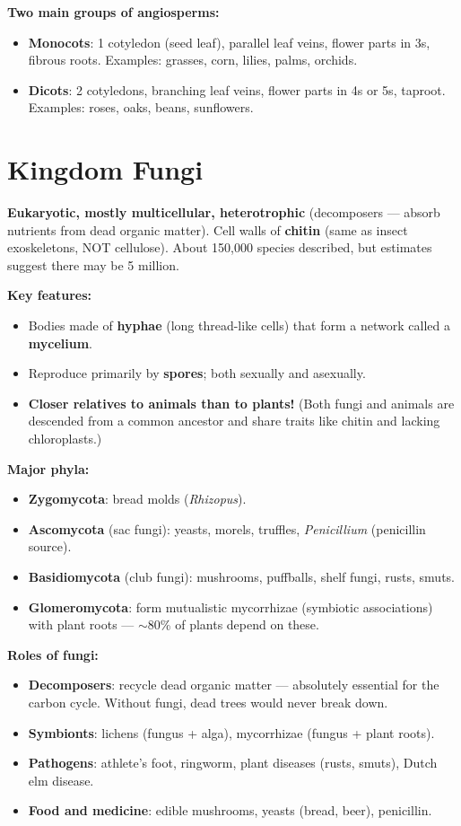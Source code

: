 \documentclass[11pt, letterpaper]{article}
\begin{document}
\textbf{Two main groups of angiosperms:}
\begin{itemize}[noitemsep]
  \item \textbf{Monocots}: 1 cotyledon (seed leaf), parallel leaf veins, flower parts in 3s, fibrous roots. Examples: grasses, corn, lilies, palms, orchids.
  \item \textbf{Dicots}: 2 cotyledons, branching leaf veins, flower parts in 4s or 5s, taproot. Examples: roses, oaks, beans, sunflowers.
\end{itemize}

\section*{Kingdom Fungi}

\textbf{Eukaryotic, mostly multicellular, heterotrophic} (decomposers --- absorb nutrients
from dead organic matter). Cell walls of \textbf{chitin} (same as insect exoskeletons, NOT
cellulose). About 150{,}000 species described, but estimates suggest there may be 5 million.

\textbf{Key features:}
\begin{itemize}[noitemsep]
  \item Bodies made of \textbf{hyphae} (long thread-like cells) that form a network called a \textbf{mycelium}.
  \item Reproduce primarily by \textbf{spores}; both sexually and asexually.
  \item \textbf{Closer relatives to animals than to plants!} (Both fungi and animals are descended from a common ancestor and share traits like chitin and lacking chloroplasts.)
\end{itemize}

\textbf{Major phyla:}
\begin{itemize}[noitemsep]
  \item \textbf{Zygomycota}: bread molds (\textit{Rhizopus}).
  \item \textbf{Ascomycota} (sac fungi): yeasts, morels, truffles, \textit{Penicillium} (penicillin source).
  \item \textbf{Basidiomycota} (club fungi): mushrooms, puffballs, shelf fungi, rusts, smuts.
  \item \textbf{Glomeromycota}: form mutualistic mycorrhizae (symbiotic associations) with plant roots --- $\sim$80\% of plants depend on these.
\end{itemize}

\textbf{Roles of fungi:}
\begin{itemize}[noitemsep]
  \item \textbf{Decomposers}: recycle dead organic matter --- absolutely essential for the carbon cycle. Without fungi, dead trees would never break down.
  \item \textbf{Symbionts}: lichens (fungus + alga), mycorrhizae (fungus + plant roots).
  \item \textbf{Pathogens}: athlete's foot, ringworm, plant diseases (rusts, smuts), Dutch elm disease.
  \item \textbf{Food and medicine}: edible mushrooms, yeasts (bread, beer), penicillin.
\end{itemize}
\end{document}
